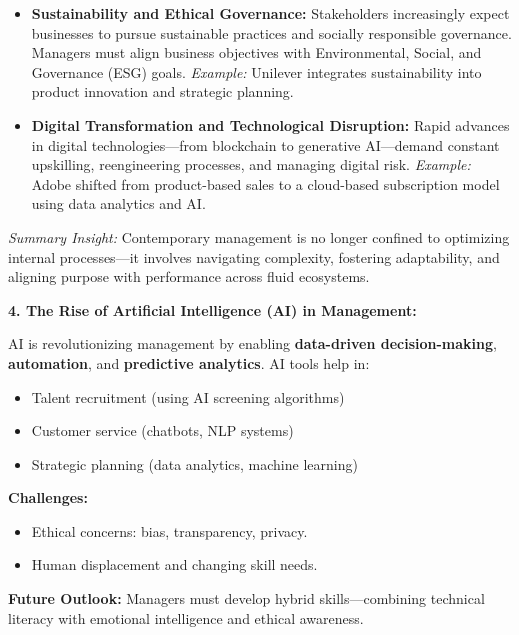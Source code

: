 \documentclass[10pt,a4paper]{book}
\begin{document}
\begin{itemize}
    \item \textbf{Sustainability and Ethical Governance:}  
    Stakeholders increasingly expect businesses to pursue sustainable practices and socially responsible governance. Managers must align business objectives with Environmental, Social, and Governance (ESG) goals.  
    \textit{Example:} Unilever integrates sustainability into product innovation and strategic planning.

    \item \textbf{Digital Transformation and Technological Disruption:}  
    Rapid advances in digital technologies—from blockchain to generative AI—demand constant upskilling, reengineering processes, and managing digital risk.  
    \textit{Example:} Adobe shifted from product-based sales to a cloud-based subscription model using data analytics and AI.

\end{itemize}

\vspace{0.5cm}
\textit{Summary Insight:}  
Contemporary management is no longer confined to optimizing internal processes—it involves navigating complexity, fostering adaptability, and aligning purpose with performance across fluid ecosystems.



\textbf{4. The Rise of Artificial Intelligence (AI) in Management:}

AI is revolutionizing management by enabling \textbf{data-driven decision-making}, \textbf{automation}, and \textbf{predictive analytics}. AI tools help in:
\begin{itemize}
    \item Talent recruitment (using AI screening algorithms)
    \item Customer service (chatbots, NLP systems)
    \item Strategic planning (data analytics, machine learning)
\end{itemize}

\textbf{Challenges:}
\begin{itemize}
    \item Ethical concerns: bias, transparency, privacy.
    \item Human displacement and changing skill needs.
\end{itemize}

\textbf{Future Outlook:} Managers must develop hybrid skills—combining technical literacy with emotional intelligence and ethical awareness.
\end{document}
